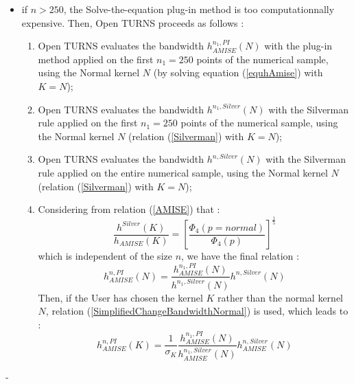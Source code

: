 {\begin{itemize}
  \item if $n>250$, the Solve-the-equation  plug-in method is too computationnally expensive. Then, Open TURNS proceeds as follows :
    \begin{enumerate}
    \item Open TURNS evaluates the bandwidth $h^{n_1, PI}_{AMISE}(N)$ with the plug-in method applied on the first $n_1 = 250$ points of the numerical sample, using the Normal kernel $N$ (by solving equation (\ref{equhAmise}) with $K=N$);
    \item Open TURNS evaluates the bandwidth $h^{n_1, Silver}(N)$ with the Silverman rule applied on the first $n_1 = 250$ points of the numerical sample, using the Normal kernel $N$ (relation (\ref{Silverman}) with $K=N$);
    \item Open TURNS evaluates the bandwidth $h^{n, Silver}(N)$ with the Silverman rule applied on the entire numerical sample, using the Normal kernel $N$ (relation (\ref{Silverman}) with $K=N$);
    \item Considering from relation (\ref{AMISE})  that :
      \begin{equation}
        \label{fracSilvAmise}
        \displaystyle \frac{h^{Silver}(K)}{h_{AMISE}(K)} = \left[ \frac{\Phi_4(p=normal)}{\Phi_4(p)}\right]^{\frac{1}{5}}
      \end{equation}
      which is independent of the size $n$, we have the final relation :
      \begin{equation}
        \label{fracSilvAmiseFin}
        \displaystyle h^{n, PI}_{AMISE}(N) = \frac{h^{n_1, PI}_{AMISE}(N)}{h^{n_1, Silver}(N)}h^{n, Silver}(N)
      \end{equation}
      Then, if the User has chosen the kernel $K$ rather than the normal  kernel $N$, relation (\ref{SimplifiedChangeBandwidthNormal}) is used, which leads to :
      \begin{equation}
        \label{OTrule}
        \displaystyle h^{n, PI}_{AMISE}(K) = \frac{1}{\sigma_K} \frac{h^{n_1, PI}_{AMISE}(N)}{h^{n_1, Silver}_{AMISE}(N)}h^{n, Silver}_{AMISE}(N)
      \end{equation}
    \end{enumerate}
  \end{itemize}





}
{
  -
}

